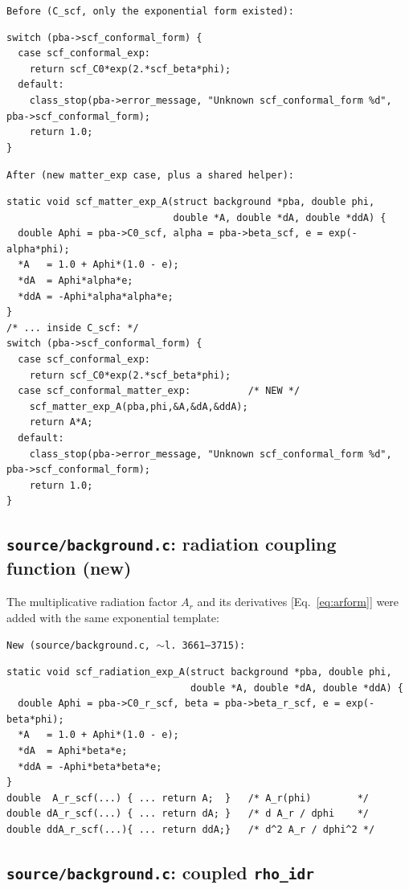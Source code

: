 \documentclass[11pt,a4paper,english,twoside]{article}
\newcommand{\codefile}[1]{\smallskip\noindent\texttt{\small #1}\par\nopagebreak}
\begin{document}
\codefile{Before (\texttt{C\_scf}, only the exponential form existed):}
\begin{lstlisting}[style=cstyle]
switch (pba->scf_conformal_form) {
  case scf_conformal_exp:
    return scf_C0*exp(2.*scf_beta*phi);
  default:
    class_stop(pba->error_message, "Unknown scf_conformal_form %d", pba->scf_conformal_form);
    return 1.0;
}
\end{lstlisting}

\codefile{After (new \texttt{matter\_exp} case, plus a shared helper):}
\begin{lstlisting}[style=cstyle]
static void scf_matter_exp_A(struct background *pba, double phi,
                             double *A, double *dA, double *ddA) {
  double Aphi = pba->C0_scf, alpha = pba->beta_scf, e = exp(-alpha*phi);
  *A   = 1.0 + Aphi*(1.0 - e);
  *dA  = Aphi*alpha*e;
  *ddA = -Aphi*alpha*alpha*e;
}
/* ... inside C_scf: */
switch (pba->scf_conformal_form) {
  case scf_conformal_exp:
    return scf_C0*exp(2.*scf_beta*phi);
  case scf_conformal_matter_exp:          /* NEW */
    scf_matter_exp_A(pba,phi,&A,&dA,&ddA);
    return A*A;
  default:
    class_stop(pba->error_message, "Unknown scf_conformal_form %d", pba->scf_conformal_form);
    return 1.0;
}
\end{lstlisting}

\subsection{\texttt{source/background.c}: radiation coupling function (new)}

The multiplicative radiation factor $A_r$ and its derivatives
[Eq.~\eqref{eq:arform}] were added with the same exponential template:

\codefile{New (\texttt{source/background.c}, $\sim$l.\,3661--3715):}
\begin{lstlisting}[style=cstyle]
static void scf_radiation_exp_A(struct background *pba, double phi,
                                double *A, double *dA, double *ddA) {
  double Aphi = pba->C0_r_scf, beta = pba->beta_r_scf, e = exp(-beta*phi);
  *A   = 1.0 + Aphi*(1.0 - e);
  *dA  = Aphi*beta*e;
  *ddA = -Aphi*beta*beta*e;
}
double  A_r_scf(...) { ... return A;  }   /* A_r(phi)        */
double dA_r_scf(...) { ... return dA; }   /* d A_r / dphi    */
double ddA_r_scf(...){ ... return ddA;}   /* d^2 A_r / dphi^2 */
\end{lstlisting}

\subsection{\texttt{source/background.c}: coupled \texttt{rho\_idr}}
\end{document}
